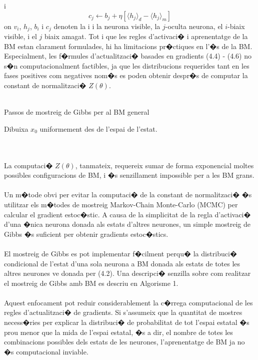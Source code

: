 \documentclass[12pt,a4paper,openright,oneside]{article}
\numberwithin{equation}{section}
\theoremstyle{definition}
\begin{document}
i 
\begin{equation}
c_{j}\leftarrow b_{j} + \eta [\langle h_j \rangle_d - \langle h_j \rangle_m]
\end{equation} 
on ${v_i}$, ${h_j}$, ${b_{i}}$ i ${c_{j}}$ denoten la i i la neurona visible, la ${j}$-oculta neurona, el $i{}$-biaix visible, i el ${j}$ biaix amagat.
\newpage
Tot i que les regles d'activaci� i aprenentatge de la BM estan clarament formulades, hi ha limitacions pr�ctiques en l'�s de la BM. Especialment, les f�rmules d'actualitzaci� basades en gradients (4.4) - (4.6) no s�n computacionalment factibles, ja que les distribucions requerides tant en les fases positives com negatives nom�s es poden obtenir despr�s de computar la constant de normalitzaci� ${Z(\theta)}$.\\\\
\begin{algorithm}
\caption{ Passos de mostreig de Gibbs per al BM general}
\begin{algorithmic} 
\STATE Dibuixa $x_0$ uniformement des de l'espai de l'estat.
\REPEAT 
{}  \ENDFOR 
{}
\end{algorithmic}
\end{algorithm}\\\\
La computaci� ${Z(\theta)}$, tanmateix, requereix sumar de forma exponencial moltes possibles configuracions de BM, i �s senzillament impossible per a les BM grans.\\\\
Un m�tode obvi per evitar la computaci� de la constant de normalitzaci� �s utilitzar els m�todes de mostreig Markov-Chain Monte-Carlo (MCMC) per calcular el gradient estoc�stic. A causa de la simplicitat de la regla d'activaci� d'una �nica neurona donada als estats d'altres neurones, un simple mostreig de Gibbs �s suficient per obtenir gradients estoc�stics. \\\\
El mostreig de Gibbs es pot implementar f�cilment perqu� la distribuci� condicional de l'estat d'una sola neurona a BM donada als estats de totes les altres neurones ve donada per (4.2). Una descripci� senzilla sobre com realitzar el mostreig de Gibbs amb BM es descriu en Algorisme 1. \\\\
Aquest enfocament pot reduir considerablement la c�rrega computacional de les regles d'actualitzaci� de gradients. Si s'assumeix que la quantitat de mostres necess�ries per explicar la distribuci� de probabilitat de tot l'espai estatal �s prou menor que la mida de l'espai estatal, �s a dir, el nombre de totes les combinacions possibles dels estats de les neurones, l'aprenentatge de BM ja no �s computacional inviable.\\\\
\end{document}
